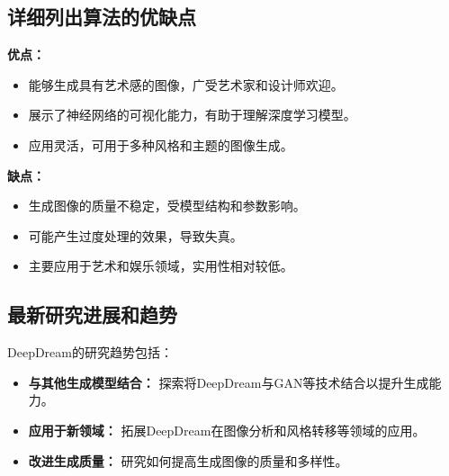 \subsection*{详细列出算法的优缺点}
\textbf{优点：}
\begin{itemize}
    \item 能够生成具有艺术感的图像，广受艺术家和设计师欢迎。
    \item 展示了神经网络的可视化能力，有助于理解深度学习模型。
    \item 应用灵活，可用于多种风格和主题的图像生成。
\end{itemize}

\textbf{缺点：}
\begin{itemize}
    \item 生成图像的质量不稳定，受模型结构和参数影响。
    \item 可能产生过度处理的效果，导致失真。
    \item 主要应用于艺术和娱乐领域，实用性相对较低。
\end{itemize}

\subsection*{最新研究进展和趋势}
DeepDream的研究趋势包括：
\begin{itemize}
    \item \textbf{与其他生成模型结合：} 探索将DeepDream与GAN等技术结合以提升生成能力。
    \item \textbf{应用于新领域：} 拓展DeepDream在图像分析和风格转移等领域的应用。
    \item \textbf{改进生成质量：} 研究如何提高生成图像的质量和多样性。
\end{itemize}
